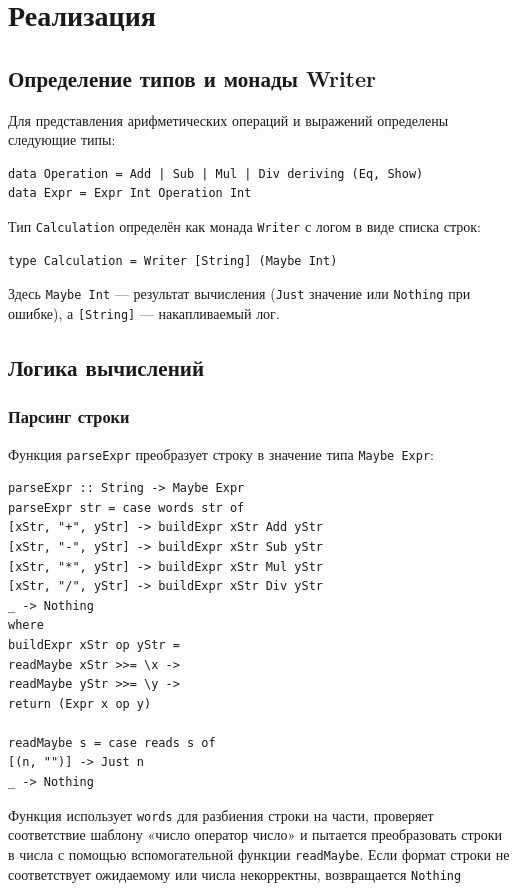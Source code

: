 \documentclass[a4paper, final]{article}
\begin{document}
\newpage
\section{Реализация}

\subsection{Определение типов и монады Writer}

Для представления арифметических операций и выражений определены следующие типы:

\begin{lstlisting}
data Operation = Add | Sub | Mul | Div deriving (Eq, Show)
data Expr = Expr Int Operation Int
\end{lstlisting}

Тип \texttt{Calculation} определён как монада \texttt{Writer} с логом в виде списка строк:

\begin{lstlisting}
type Calculation = Writer [String] (Maybe Int)
\end{lstlisting}

Здесь \texttt{Maybe Int} — результат вычисления (\texttt{Just} значение или \texttt{Nothing} при ошибке), а \texttt{[String]} — накапливаемый лог.

\subsection{Логика вычислений}

\subsubsection*{Парсинг строки}

Функция \texttt{parseExpr} преобразует строку в значение типа \texttt{Maybe Expr}:

\begin{lstlisting}
parseExpr :: String -> Maybe Expr
parseExpr str = case words str of
[xStr, "+", yStr] -> buildExpr xStr Add yStr
[xStr, "-", yStr] -> buildExpr xStr Sub yStr  
[xStr, "*", yStr] -> buildExpr xStr Mul yStr
[xStr, "/", yStr] -> buildExpr xStr Div yStr
_ -> Nothing
where
buildExpr xStr op yStr = 
readMaybe xStr >>= \x ->
readMaybe yStr >>= \y ->
return (Expr x op y)

readMaybe s = case reads s of
[(n, "")] -> Just n
_ -> Nothing
\end{lstlisting}

Функция использует \texttt{words} для разбиения строки на части, проверяет соответствие шаблону «число оператор число» и пытается преобразовать строки в числа с помощью вспомогательной функции \texttt{readMaybe}. Если формат строки не соответствует ожидаемому или числа некорректны, возвращается \texttt{Nothing}
\end{document}
